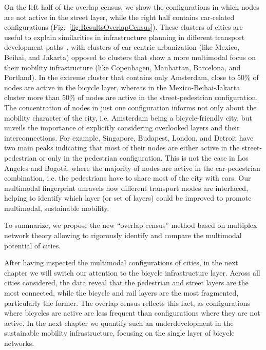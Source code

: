 On the left half of the overlap census, we show the configurations in which nodes are not active in the street layer, while the right half contains car-related configurations (Fig.~\ref{fig:ResultsOverlapCensus}). These clusters of cities are useful to explain similarities in infrastructure planning in different transport development paths~\cite{Rodrigue2013Geography,louf2014typology}, with clusters of car-centric urbanization (like Mexico, Beihai, and Jakarta) opposed to clusters that show a more multimodal focus on their mobility infrastructure (like Copenhagen, Manhattan, Barcelona, and Portland). In the extreme cluster that contains only Amsterdam, close to $50\%$ of nodes are active in the bicycle layer, whereas in the Mexico-Beihai-Jakarta cluster more than $50\%$ of nodes are active in the street-pedestrian configuration. The concentration of nodes in just one configuration informs not only about the mobility character of the city, i.e. Amsterdam being a bicycle-friendly city, but unveils the importance of explicitly considering overlooked layers and their interconnections. For example, Singapore, Budapest, London, and Detroit have two main peaks indicating that most of their nodes are either active in the street-pedestrian or only in the pedestrian configuration. This is not the case in Los Angeles and Bogotá, where the majority of nodes are active in the car-pedestrian combination, i.e. the pedestrians have to share most of the city with cars. Our multimodal fingerprint unravels how different transport modes are interlaced, helping to identify which layer (or set of layers) could be improved to promote multimodal, sustainable mobility.

To summarize, we propose the new ``overlap census'' method based on multiplex network theory allowing to rigorously identify and compare the multimodal potential of cities. 

After having inspected the multimodal configurations of cities, in the next chapter we will switch our attention to the bicycle infrastructure layer. Across all cities considered, the data reveal that the pedestrian and street layers are the most connected, while the bicycle and rail layers are the most fragmented, particularly the former. The overlap census reflects this fact, as configurations where bicycles are active are less frequent than configurations where they are not active. In the next chapter we quantify such an underdevelopment in the sustainable mobility infrastructure, focusing on the single layer of bicycle networks.
